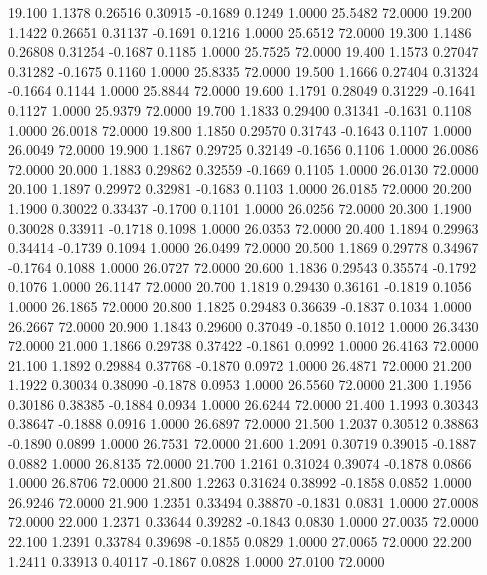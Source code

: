   19.100   1.1378   0.26516   0.30915  -0.1689   0.1249   1.0000  25.5482  72.0000
  19.200   1.1422   0.26651   0.31137  -0.1691   0.1216   1.0000  25.6512  72.0000
  19.300   1.1486   0.26808   0.31254  -0.1687   0.1185   1.0000  25.7525  72.0000
  19.400   1.1573   0.27047   0.31282  -0.1675   0.1160   1.0000  25.8335  72.0000
  19.500   1.1666   0.27404   0.31324  -0.1664   0.1144   1.0000  25.8844  72.0000
  19.600   1.1791   0.28049   0.31229  -0.1641   0.1127   1.0000  25.9379  72.0000
  19.700   1.1833   0.29400   0.31341  -0.1631   0.1108   1.0000  26.0018  72.0000
  19.800   1.1850   0.29570   0.31743  -0.1643   0.1107   1.0000  26.0049  72.0000
  19.900   1.1867   0.29725   0.32149  -0.1656   0.1106   1.0000  26.0086  72.0000
  20.000   1.1883   0.29862   0.32559  -0.1669   0.1105   1.0000  26.0130  72.0000
  20.100   1.1897   0.29972   0.32981  -0.1683   0.1103   1.0000  26.0185  72.0000
  20.200   1.1900   0.30022   0.33437  -0.1700   0.1101   1.0000  26.0256  72.0000
  20.300   1.1900   0.30028   0.33911  -0.1718   0.1098   1.0000  26.0353  72.0000
  20.400   1.1894   0.29963   0.34414  -0.1739   0.1094   1.0000  26.0499  72.0000
  20.500   1.1869   0.29778   0.34967  -0.1764   0.1088   1.0000  26.0727  72.0000
  20.600   1.1836   0.29543   0.35574  -0.1792   0.1076   1.0000  26.1147  72.0000
  20.700   1.1819   0.29430   0.36161  -0.1819   0.1056   1.0000  26.1865  72.0000
  20.800   1.1825   0.29483   0.36639  -0.1837   0.1034   1.0000  26.2667  72.0000
  20.900   1.1843   0.29600   0.37049  -0.1850   0.1012   1.0000  26.3430  72.0000
  21.000   1.1866   0.29738   0.37422  -0.1861   0.0992   1.0000  26.4163  72.0000
  21.100   1.1892   0.29884   0.37768  -0.1870   0.0972   1.0000  26.4871  72.0000
  21.200   1.1922   0.30034   0.38090  -0.1878   0.0953   1.0000  26.5560  72.0000
  21.300   1.1956   0.30186   0.38385  -0.1884   0.0934   1.0000  26.6244  72.0000
  21.400   1.1993   0.30343   0.38647  -0.1888   0.0916   1.0000  26.6897  72.0000
  21.500   1.2037   0.30512   0.38863  -0.1890   0.0899   1.0000  26.7531  72.0000
  21.600   1.2091   0.30719   0.39015  -0.1887   0.0882   1.0000  26.8135  72.0000
  21.700   1.2161   0.31024   0.39074  -0.1878   0.0866   1.0000  26.8706  72.0000
  21.800   1.2263   0.31624   0.38992  -0.1858   0.0852   1.0000  26.9246  72.0000
  21.900   1.2351   0.33494   0.38870  -0.1831   0.0831   1.0000  27.0008  72.0000
  22.000   1.2371   0.33644   0.39282  -0.1843   0.0830   1.0000  27.0035  72.0000
  22.100   1.2391   0.33784   0.39698  -0.1855   0.0829   1.0000  27.0065  72.0000
  22.200   1.2411   0.33913   0.40117  -0.1867   0.0828   1.0000  27.0100  72.0000
